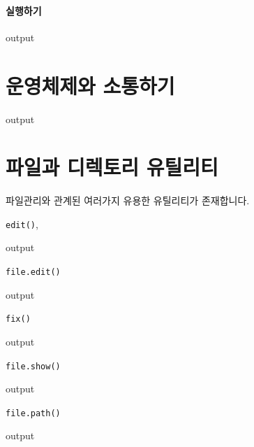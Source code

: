 \documentclass{book}
\begin{document}
\paragraph{실행하기}
\begin{Schunk}
\begin{Soutput}
output
\end{Soutput}
\end{Schunk}

\section{운영체제와 소통하기}
\begin{Schunk}
\begin{Soutput}
output
\end{Soutput}
\end{Schunk}

\section{파일과 디렉토리 유틸리티}
파일관리와 관계된 여러가지 유용한 유틸리티가 존재합니다. 

\texttt{edit()},
\begin{Schunk}
\begin{Soutput}
output
\end{Soutput}
\end{Schunk}

\texttt{file.edit()}
\begin{Schunk}
\begin{Soutput}
output
\end{Soutput}
\end{Schunk}

\texttt{fix()}
\begin{Schunk}
\begin{Soutput}
output
\end{Soutput}
\end{Schunk}

\texttt{file.show()}
\begin{Schunk}
\begin{Soutput}
output
\end{Soutput}
\end{Schunk}

\texttt{file.path()}
\begin{Schunk}
\begin{Soutput}
output
\end{Soutput}
\end{Schunk}
\end{document}
